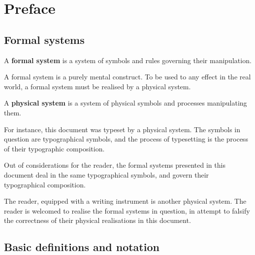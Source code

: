 
\chapter{Preface}


\section{Formal systems}

\begin{notion}

A \textbf{formal system} is a system of symbols and rules governing their
manipulation.

\end{notion}

A formal system is a purely mental construct. To be used to any effect in the
real world, a formal system must be realised by a physical system.

\begin{notion}

A \textbf{physical system} is a system of physical symbols and processes
manipulating them. 

\end{notion}

For instance, this document was typeset by a physical system. The symbols in
question are typographical symbols, and the process of typesetting is the
process of their typographic composition.

Out of considerations for the reader, the formal systems presented in this
document deal in the same typographical symbols, and govern their typographical
composition.

The reader, equipped with a writing instrument is another physical system. The
reader is welcomed to realise the formal systems in question, in attempt to
falsify the correctness of their physical realisations in this document. 

\section{Basic definitions and notation}

